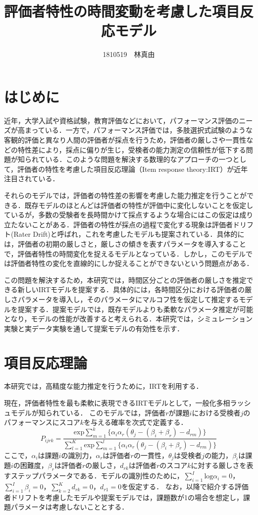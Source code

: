 \documentclass[dvipdfmx, twocolumn, a4paper]{hcresume}
\title{\bf 評価者特性の時間変動を考慮した項目反応モデル}
\author{1810519　林真由}
\begin{document}
\maketitle
\pagestyle{empty}
\thispagestyle{empty}
\section{はじめに}
近年，大学入試や資格試験，教育評価などにおいて，パフォーマンス評価のニーズが高まっている．一方で，パフォーマンス評価では，多肢選択式試験のような客観的評価と異なり人間の評価者が採点を行うため，評価者の厳しさや一貫性などの特性差により，採点に偏りが生じ，受検者の能力測定の信頼性が低下する問題が知られている．このような問題を解決する数理的なアプローチの一つとして，評価者の特性を考慮した項目反応理論（Item response theory:IRT）\cite{IRTLord}が近年注目されている．

それらのモデルでは，評価者の特性差の影響を考慮した能力推定を行うことができる．既存モデルのほとんどは評価者の特性が評価中に変化しないことを仮定しているが，多数の受験者を長時間かけて採点するような場合にはこの仮定は成り立たないことがある．評価者の特性が採点の過程で変化する現象は評価者ドリフト(Rater Drift)と呼ばれ，これを考慮したモデルも提案されている．具体的には，評価者の初期の厳しさと，厳しさの傾きを表すパラメータを導入することで，評価者特性の時間変化を捉えるモデルとなっている．しかし，このモデルでは評価者特性の変化を直線的にしか捉えることができないという問題点がある．

この問題を解決するため，本研究では，時間区分ごとの評価者の厳しさを推定できる新しいIRTモデルを提案する．具体的には，各時間区分における評価者の厳しさパラメータを導入し，そのパラメータにマルコフ性を仮定して推定するモデルを提案する．提案モデルでは，既存モデルよりも柔軟なパラメータ推定が可能となり，モデルの性能が改善すると考えられる．本研究では，シミュレーション実験と実データ実験を通して提案モデルの有効性を示す．

\section{項目反応理論}
本研究では，高精度な能力推定を行うために，IRTを利用する．

現在，評価者特性を最も柔軟に表現できるIRTモデルとして，一般化多相ラッシュモデルが知られている\cite{g-MFRM}．
このモデルでは，評価者$r$が課題$i$における受検者$j$のパフォーマンスにスコア$k$を与える確率を次式で定義する．
\begin{equation}
  P_{ijrk}=\frac{\mathrm{exp}\sum_{m=1}^{k}\{\alpha_i\alpha_r(\theta_{j}-(\beta_{i}+\beta_{r})-d_{rm})\}}{\sum_{l=1}^{K}\mathrm{exp}\sum_{m=1}^{l}\{\alpha_i\alpha_r(\theta_{j}-(\beta_{i}+\beta_{r})-d_{rm})\}}
\end{equation}
ここで，$\alpha_i$は課題$i$の識別力，$\alpha_r$は評価者$r$の一貫性，$\theta_j$は受検者$j$の能力，$\beta_i$は課題$i$の困難度，$\beta_r$は評価者$r$の厳しさ，$d_{rk}$は評価者$r$のスコア$k$に対する厳しさを表すステップパラメータである．モデルの識別性のために，$\sum^{I}_{i=1}{\mathrm{log}\alpha_i}=0$，$\sum^{I}_{i=1}{\beta_i}=0$，$\sum^{K}_{k=2}{d_{rk}}=0$，$d_{r1}=0$を仮定する．
なお，以降で紹介する評価者ドリフトを考慮したモデルや提案モデルでは，課題数が1の場合を想定し，課題パラメータは考慮しないこととする．
\end{document}

